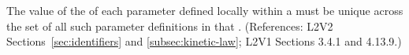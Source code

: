 The value of the   of each parameter defined locally within
a \KineticLaw must be unique across the set of all such parameter
definitions in that \KineticLaw.  (References: L2V2
Sections~\ref{sec:identifiers} and \ref{subsec:kinetic-law}; L2V1 Sections
3.4.1 and 4.13.9.)
